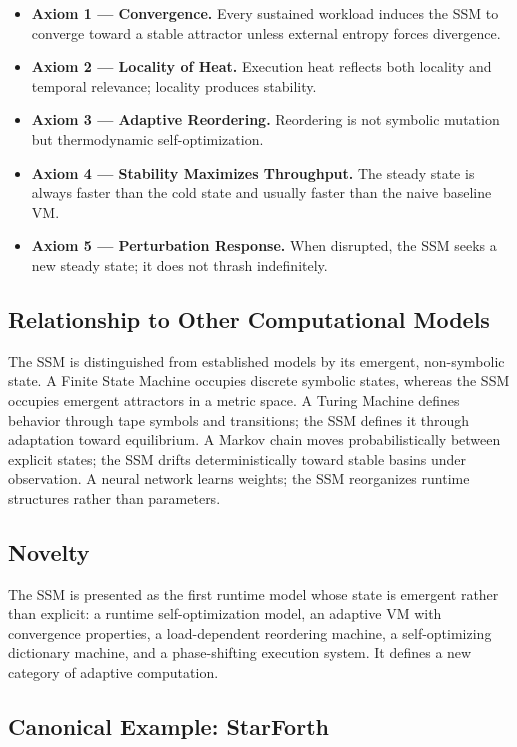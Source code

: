 \begin{itemize}
  \item \textbf{Axiom 1 --- Convergence.} Every sustained workload induces the
        SSM to converge toward a stable attractor unless external entropy forces
        divergence.
  \item \textbf{Axiom 2 --- Locality of Heat.} Execution heat reflects both
        locality and temporal relevance; locality produces stability.
  \item \textbf{Axiom 3 --- Adaptive Reordering.} Reordering is not symbolic
        mutation but thermodynamic self-optimization.
  \item \textbf{Axiom 4 --- Stability Maximizes Throughput.} The steady state is
        always faster than the cold state and usually faster than the naive
        baseline VM.
  \item \textbf{Axiom 5 --- Perturbation Response.} When disrupted, the SSM seeks
        a new steady state; it does not thrash indefinitely.
\end{itemize}

\subsection{Relationship to Other Computational Models}

The SSM is distinguished from established models by its emergent, non-symbolic
state. A Finite State Machine occupies discrete symbolic states, whereas the SSM
occupies emergent attractors in a metric space. A Turing Machine defines behavior
through tape symbols and transitions; the SSM defines it through adaptation toward
equilibrium. A Markov chain moves probabilistically between explicit states; the
SSM drifts deterministically toward stable basins under observation. A neural
network learns weights; the SSM reorganizes runtime structures rather than
parameters.

\subsection{Novelty}

The SSM is presented as the first runtime model whose state is emergent rather
than explicit: a runtime self-optimization model, an adaptive VM with convergence
properties, a load-dependent reordering machine, a self-optimizing dictionary
machine, and a phase-shifting execution system. It defines a new category of
adaptive computation.

\subsection{Canonical Example: StarForth}

